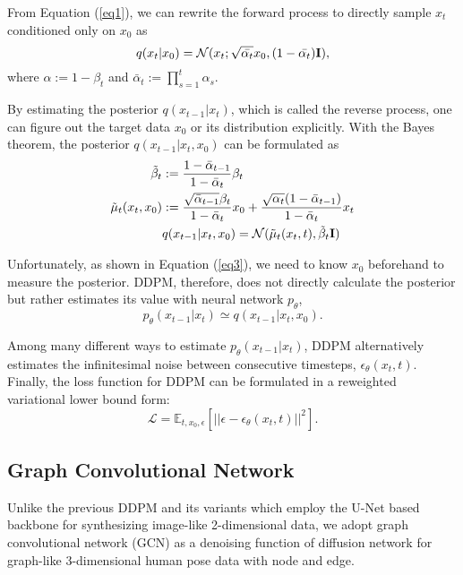 \documentclass[letterpaper, 10 pt, conference]{ieeeconf}
\begin{document}
From Equation (\ref{eq1}), we can rewrite the forward process to directly sample $x_t$ conditioned only on $x_0$ as
\begin{equation}
        q(x_t|x_0) = \mathcal{N}(x_t;\sqrt{\Bar{\alpha_t}}x_0, (1-\Bar{\alpha_t})\mathbf{I}),
    \label{eq2}
\end{equation}
where $\alpha:=1-\beta_t$ and $\bar{\alpha}_t:=\prod_{s=1}^t\alpha_s$.

By estimating the posterior $q(x_{t-1}|x_{t})$, which is called the reverse process, one can figure out the target data $x_{0}$ or its distribution explicitly.
With the Bayes theorem, the posterior $q(x_{t-1}|x_{t}, x_{0})$ can be formulated as
\begin{equation}
\begin{split}
\tilde{\beta}_{t} &:= \frac{1-\Bar{\alpha}_{t-1}}{1-\Bar{\alpha}_{t}}\beta_{t}\\
\tilde{\mu}_{t}(x_{t}, x_{0}) &:= \frac{\sqrt{\Bar{\alpha}_{t-1}}\beta_{t}}{1-\Bar{\alpha}_{t}}x_{0} + \frac{\sqrt{\alpha_{t}}(1-\Bar{\alpha}_{t-1})}{1-\Bar{\alpha}_{t}}x_{t}\\
&q(x_{t-1}|x_{t}, x_{0}) = \mathcal{N}(\tilde{\mu}_{t}(x_{t}, t), \tilde{\beta}_{t}\mathbf{I})
\end{split}
\label{eq3}
\end{equation}

Unfortunately, as shown in Equation (\ref{eq3}), we need to know $x_{0}$ beforehand to measure the posterior.
DDPM, therefore, does not directly calculate the posterior but rather estimates its value with neural network $p_{\theta}$,
\begin{equation}
    p_{\theta}(x_{t-1}|x_{t}) \simeq q(x_{t-1}|x_{t},x_{0}).
\end{equation}

Among many different ways to estimate $p_{\theta}(x_{t-1}|x_{t})$, DDPM alternatively estimates the infinitesimal noise between consecutive timesteps, $\epsilon_{\theta}(x_{t}, t)$. Finally, the loss function for DDPM can be formulated in a reweighted variational lower bound form:
\begin{equation}
    \mathcal{L} = \mathbb{E}_{t,x_{0}, \epsilon}[||\epsilon - \epsilon_{\theta}(x_{t},t)||^{2}].
\end{equation}

\subsection{Graph Convolutional Network}
Unlike the previous DDPM \cite{ho2020denoising} and its variants \cite{song2020denoising, rombach2022high, dhariwal2021diffusion} which employ the U-Net \cite{ronneberger2015u} based backbone for synthesizing image-like 2-dimensional data, 
we adopt graph convolutional network (GCN) \cite{kipf2016semi} as a denoising function of diffusion network for graph-like 3-dimensional human pose data with node and edge.
\end{document}
